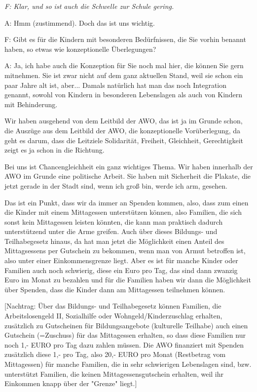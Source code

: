 \begin{linenumbers*}
\emph{F: Klar, und so ist auch die Schwelle zur Schule gering.}

A: Hmm (zustimmend). Doch das ist uns wichtig.

{F: Gibt es für die Kindern mit besonderen Bedürfnissen, die Sie vorhin benannt haben, so etwas wie konzeptionelle Überlegungen?}

A: Ja, ich habe auch die Konzeption für Sie noch mal hier, die können Sie gern mitnehmen. Sie ist zwar nicht auf dem ganz aktuellen Stand, weil sie schon ein paar Jahre alt ist, aber... Damals natürlich hat man das noch Integration genannt, sowohl von Kindern in besonderen Lebenslagen als auch von Kindern mit Behinderung. 

Wir haben ausgehend von dem Leitbild der AWO, das ist ja im Grunde schon, die Auszüge aus dem Leitbild der AWO, die konzeptionelle Vorüberlegung, da geht es darum, dass die Leitziele Solidarität, Freiheit, Gleichheit, Gerechtigkeit zeigt es ja schon in die Richtung. 

Bei uns ist Chancengleichheit ein ganz wichtiges Thema. 
Wir haben innerhalb der AWO im Grunde eine politische Arbeit. Sie haben mit Sicherheit die Plakate, die jetzt gerade in der Stadt sind, wenn ich groß bin, werde ich arm, gesehen. 

Das ist ein Punkt, dass wir da immer an Spenden kommen, also, dass zum einen die Kinder mit einem Mittagessen unterstützen können, also Familien, die sich sonst kein Mittagessen leisten könnten, die kann man praktisch dadurch unterstützend unter die Arme greifen. Auch über dieses Bildungs- und Teilhabegesetz hinaus, da hat man jetzt die Möglichkeit einen Anteil des Mittagsessens per Gutschein zu bekommen, wenn man von Armut betroffen ist, also unter einer Einkommensgrenze liegt. Aber es ist für manche Kinder oder Familien auch noch schwierig, diese ein Euro pro Tag, das sind dann zwanzig Euro im Monat zu bezahlen und für die Familien haben wir dann die Möglichkeit über Spenden, dass die Kinder dann am Mittagessen teilnehmen können. 

[Nachtrag: Über das Bildungs- und Teilhabegesetz können Familien, die Arbeitslosengeld II, Sozialhilfe oder Wohngeld/Kinderzuschlag erhalten, zusätzlich zu Gutscheinen für Bildungsangebote (kulturelle Teilhabe) auch einen Gutschein (=Zuschuss) für das Mittagessen erhalten, so dass diese Familien nur noch 1,- EURO pro Tag dazu zahlen müssen. 
Die AWO finanziert mit Spenden zusätzlich diese 1,- pro Tag, also 20,- EURO pro Monat (Restbetrag vom Mittagessen) für manche Familien, die in sehr schwierigen Lebenslagen sind, bzw. unterstützt Familien, die keinen Mittagessensgutschein erhalten, weil ihr Einkommen knapp über der "Grenze" liegt.]


\end{linenumbers*}
